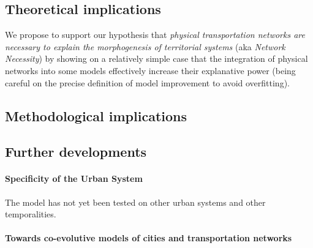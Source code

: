 \documentclass[Royal,sageh,times]{sagej}
\begin{document}
% 
%
%



\subsection*{Theoretical implications}


We propose to support our hypothesis that \textit{physical transportation networks are necessary to explain the morphogenesis of territorial systems} (aka \textit{Network Necessity}) by showing on a relatively simple case that the integration of physical networks into some models effectively increase their explanative power (being careful on the precise definition of model improvement to avoid overfitting).





\subsection*{Methodological implications}





\subsection*{Further developments}


\paragraph{Specificity of the Urban System}

The model has not yet been tested on other urban systems and other temporalities.



\paragraph{Towards co-evolutive models of cities and transportation networks}
\end{document}
